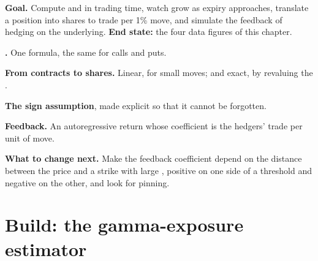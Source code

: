 \begin{tutorial}
\textbf{Goal.} Compute  and  in trading time, watch 
 grow as expiry approaches, translate a position into shares to trade
per 1\% move, and simulate the feedback of hedging on the underlying.
\textbf{End state:} the four data figures of this chapter.
\begin{tutsteps}
\item \textbf{.} One formula, the same for calls and puts.
\label{lst:m1:zero-day-options-and-retail-flow:gamma}
\item \textbf{From contracts to shares.} Linear, for small moves; and exact,
by revaluing the .
\label{lst:m1:zero-day-options-and-retail-flow:shares}
\item \textbf{The sign assumption}, made explicit so that it cannot be
forgotten.
\label{lst:m1:zero-day-options-and-retail-flow:dealer}
\item \textbf{Feedback.} An autoregressive return whose coefficient is the
hedgers' trade per unit of move.
\end{tutsteps}
\textbf{What to change next.} Make the feedback coefficient depend on the
distance between the price and a strike with large , positive
on one side of a threshold and negative on the other, and look for pinning.
\end{tutorial}

\section{Build: the gamma-exposure estimator}\label{bld:m1:zero-day-options-and-retail-flow:gex}

